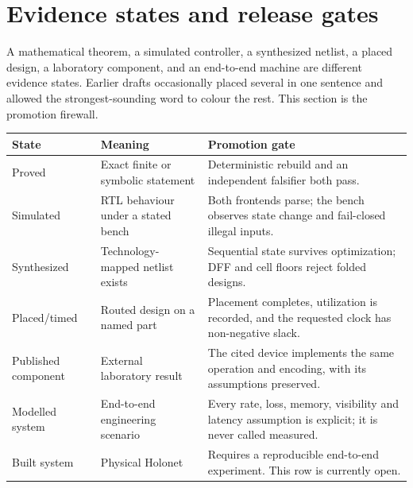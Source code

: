 \section{Evidence states and release gates}\label{sec:evidence}

\begin{plain}
A mathematical theorem, a simulated controller, a synthesized netlist, a placed design, a
laboratory component, and an end-to-end machine are different evidence states. Earlier
drafts occasionally placed several in one sentence and allowed the strongest-sounding
word to colour the rest. This section is the promotion firewall.
\end{plain}

\begin{spec}
\begin{center}
\begin{tabular}{@{}p{2.0cm}p{4.4cm}p{6.2cm}@{}}
\toprule
\textbf{State} & \textbf{Meaning} & \textbf{Promotion gate}\\
\midrule
Proved & Exact finite or symbolic statement & Deterministic rebuild and an independent
falsifier both pass.\\
Simulated & RTL behaviour under a stated bench & Both frontends parse; the bench observes
state change and fail-closed illegal inputs.\\
Synthesized & Technology-mapped netlist exists & Sequential state survives optimization;
DFF and cell floors reject folded designs.\\
Placed/timed & Routed design on a named part & Placement completes, utilization is
recorded, and the requested clock has non-negative slack.\\
Published component & External laboratory result & The cited device implements the same
operation and encoding, with its assumptions preserved.\\
Modelled system & End-to-end engineering scenario & Every rate, loss, memory, visibility
and latency assumption is explicit; it is never called measured.\\
Built system & Physical Holonet & Requires a reproducible end-to-end experiment. This row
is currently open.\\
\bottomrule
\end{tabular}
\end{center}
\end{spec}

